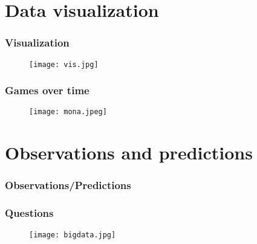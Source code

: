 \documentclass{beamer}
\begin{document}
\section{Data visualization}
\begin{frame}[fragile] 
\frametitle{Visualization}
\begin{figure}[hb]
  \centering
  \texttt{[image: vis.jpg]}
 
\end{figure}
\end{frame}
\begin{frame}
\frametitle{Games over time}

\begin{figure}[hb]
  \centering
  \texttt{[image: mona.jpeg]}
 
\end{figure}


\end {frame}



\section{Observations and predictions}




\begin{frame}[fragile] 
\frametitle{Observations/Predictions}

\end{frame}

\begin{frame}
\frametitle{Questions}


\begin{figure}
  \centering
  \texttt{[image: bigdata.jpg]}
 
\end{figure}




\end{frame}
\end{document}
